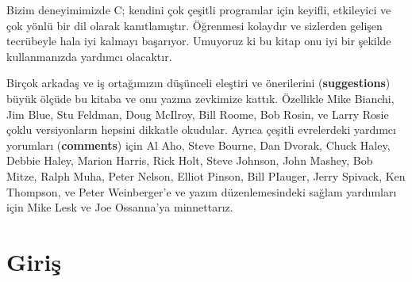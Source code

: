 \documentclass[a4paper,12pt,oneside]{book}
\begin{document}
\par Bizim deneyimimizde C; kendini çok çeşitli programlar için keyifli, etkileyici ve çok yönlü bir dil olarak kanıtlamıştır. Öğrenmesi kolaydır ve sizlerden gelişen tecrübeyle hala iyi kalmayı başarıyor. Umuyoruz ki bu kitap onu iyi bir şekilde kullanmanızda yardımcı olacaktır.
\thispagestyle{prefacetofe}
\par Birçok arkadaş ve iş ortağımızın düşünceli eleştiri ve önerilerini (\textbf{suggestions}) büyük ölçüde bu kitaba ve onu yazma zevkimize kattık. Özellikle Mike Bianchi, Jim Blue, Stu Feldman, Doug McIlroy, Bill Roome, Bob Rosin, ve Larry Rosie çoklu versiyonların hepsini dikkatle okudular. Ayrıca çeşitli evrelerdeki yardımcı yorumları (\textbf{comments}) için Al Aho, Steve Bourne, Dan Dvorak, Chuck Haley, Debbie Haley, Marion Harris, Rick Holt, Steve Johnson, John Mashey, Bob Mitze, Ralph Muha, Peter Nelson, Elliot Pinson, Bill PIauger, Jerry Spivack, Ken Thompson, ve Peter Weinberger'e ve yazım düzenlemesindeki sağlam yardımları için  Mike Lesk ve Joe Ossanna'ya minnettarız.

\noindent \hspace*{270pt}{Brian W. Kernighan \\}
\hspace*{280pt}{Dennis M. Ritchie}

\mainmatter

\chapter*{Giriş}
\end{document}
